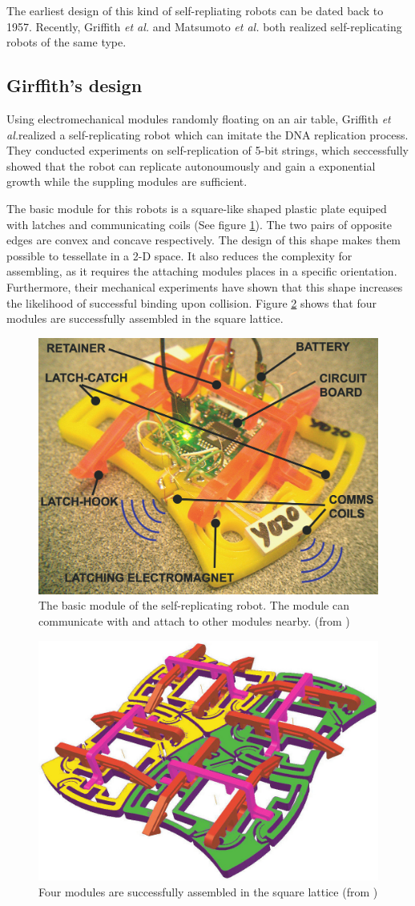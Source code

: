 \documentclass[12pt,twoside]{article}
\theoremstyle{plain}
\theoremstyle{definition}
\theoremstyle{remark}
\newcommand{\etal}{\textit{et al.}}
\begin{document}
The earliest design of this kind of self-repliating robots can be dated back to 1957\cite{penrose_self-reproducing_1957}. Recently, Griffith \etal \cite{griffith_self-replication_2005} and Matsumoto \etal \cite{matsumoto_passive_2009} both realized self-replicating robots of the same type.

\subsection{Girffith's design}
Using electromechanical modules randomly floating on an air table, Griffith \etal realized a self-replicating robot which can imitate the DNA replication process\cite{griffith_growing_2004}\cite{griffith_self-replication_2005}. They conducted experiments on self-replication of 5-bit strings, which seccessfully showed that the robot can replicate autonoumously and gain a exponential growth while the suppling modules are sufficient.

The basic module for this robots is a square-like shaped plastic plate equiped with latches and communicating coils (See figure \ref{fig:gri-unit}). The two pairs of opposite edges are convex and concave respectively. The design of this shape makes them possible to tessellate in a 2-D space. It also reduces the complexity for assembling, as it requires the attaching modules places in a specific orientation. Furthermore, their mechanical experiments have shown that this shape increases the likelihood of successful binding upon collision. Figure \ref{fig:gri-sqr} shows that four modules are successfully assembled in the square lattice. 

\begin{figure}[hbtp]
	 \centerline{\includegraphics[width=.4\textwidth]{griffith-000}}
	 {\caption{The basic module of the self-replicating robot. The module can communicate with and attach to other modules nearby. (from \cite{griffith_growing_2004})}
	 \label{fig:gri-unit}}
\end{figure}

\begin{figure}[hbtp]
	 \centerline{\includegraphics[width=.4\textwidth]{griffith-001}}
	 {\caption{Four modules are successfully assembled in the square lattice (from \cite{griffith_growing_2004})}
	 \label{fig:gri-sqr}}
\end{figure}
\end{document}
